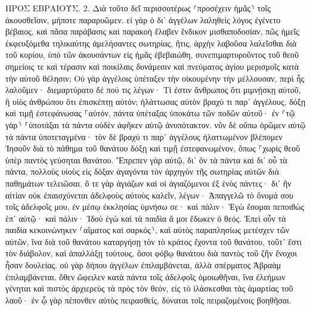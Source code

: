 \documentclass[twoside, 9pt]{extreport}
\begin{document}
ΠΡΟΣ ΕΒΡΑΙΟΥΣ.
2.
Διὰ τοῦτο δεῖ περισσοτέρως ⸂προσέχειν ἡμᾶς⸃ τοῖς ἀκουσθεῖσιν, μήποτε παραρυῶμεν. 
εἰ γὰρ ὁ δι᾽ ἀγγέλων λαληθεὶς λόγος ἐγένετο βέβαιος, καὶ πᾶσα παράβασις καὶ παρακοὴ ἔλαβεν ἔνδικον μισθαποδοσίαν, 
πῶς ἡμεῖς ἐκφευξόμεθα τηλικαύτης ἀμελήσαντες σωτηρίας, ἥτις, ἀρχὴν λαβοῦσα λαλεῖσθαι διὰ τοῦ κυρίου, ὑπὸ τῶν ἀκουσάντων εἰς ἡμᾶς ἐβεβαιώθη, 
συνεπιμαρτυροῦντος τοῦ θεοῦ σημείοις τε καὶ τέρασιν καὶ ποικίλαις δυνάμεσιν καὶ πνεύματος ἁγίου μερισμοῖς κατὰ τὴν αὐτοῦ θέλησιν; 
Οὐ γὰρ ἀγγέλοις ὑπέταξεν τὴν οἰκουμένην τὴν μέλλουσαν, περὶ ἧς λαλοῦμεν· 
διεμαρτύρατο δέ πού τις λέγων· Τί ἐστιν ἄνθρωπος ὅτι μιμνῄσκῃ αὐτοῦ, ἢ υἱὸς ἀνθρώπου ὅτι ἐπισκέπτῃ αὐτόν; 
ἠλάττωσας αὐτὸν βραχύ τι παρ᾽ ἀγγέλους, δόξῃ καὶ τιμῇ ἐστεφάνωσας ⸀αὐτόν, 
πάντα ὑπέταξας ὑποκάτω τῶν ποδῶν αὐτοῦ· ἐν ⸂τῷ γὰρ⸃ ⸀ὑποτάξαι τὰ πάντα οὐδὲν ἀφῆκεν αὐτῷ ἀνυπότακτον. νῦν δὲ οὔπω ὁρῶμεν αὐτῷ τὰ πάντα ὑποτεταγμένα· 
τὸν δὲ βραχύ τι παρ᾽ ἀγγέλους ἠλαττωμένον βλέπομεν Ἰησοῦν διὰ τὸ πάθημα τοῦ θανάτου δόξῃ καὶ τιμῇ ἐστεφανωμένον, ὅπως ⸀χωρὶς θεοῦ ὑπὲρ παντὸς γεύσηται θανάτου. 
Ἔπρεπεν γὰρ αὐτῷ, δι᾽ ὃν τὰ πάντα καὶ δι᾽ οὗ τὰ πάντα, πολλοὺς υἱοὺς εἰς δόξαν ἀγαγόντα τὸν ἀρχηγὸν τῆς σωτηρίας αὐτῶν διὰ παθημάτων τελειῶσαι. 
ὅ τε γὰρ ἁγιάζων καὶ οἱ ἁγιαζόμενοι ἐξ ἑνὸς πάντες· δι᾽ ἣν αἰτίαν οὐκ ἐπαισχύνεται ἀδελφοὺς αὐτοὺς καλεῖν, 
λέγων· Ἀπαγγελῶ τὸ ὄνομά σου τοῖς ἀδελφοῖς μου, ἐν μέσῳ ἐκκλησίας ὑμνήσω σε· 
καὶ πάλιν· Ἐγὼ ἔσομαι πεποιθὼς ἐπ᾽ αὐτῷ· καὶ πάλιν· Ἰδοὺ ἐγὼ καὶ τὰ παιδία ἅ μοι ἔδωκεν ὁ θεός. 
Ἐπεὶ οὖν τὰ παιδία κεκοινώνηκεν ⸂αἵματος καὶ σαρκός⸃, καὶ αὐτὸς παραπλησίως μετέσχεν τῶν αὐτῶν, ἵνα διὰ τοῦ θανάτου καταργήσῃ τὸν τὸ κράτος ἔχοντα τοῦ θανάτου, τοῦτ᾽ ἔστι τὸν διάβολον, 
καὶ ἀπαλλάξῃ τούτους, ὅσοι φόβῳ θανάτου διὰ παντὸς τοῦ ζῆν ἔνοχοι ἦσαν δουλείας. 
οὐ γὰρ δήπου ἀγγέλων ἐπιλαμβάνεται, ἀλλὰ σπέρματος Ἀβραὰμ ἐπιλαμβάνεται. 
ὅθεν ὤφειλεν κατὰ πάντα τοῖς ἀδελφοῖς ὁμοιωθῆναι, ἵνα ἐλεήμων γένηται καὶ πιστὸς ἀρχιερεὺς τὰ πρὸς τὸν θεόν, εἰς τὸ ἱλάσκεσθαι τὰς ἁμαρτίας τοῦ λαοῦ· 
ἐν ᾧ γὰρ πέπονθεν αὐτὸς πειρασθείς, δύναται τοῖς πειραζομένοις βοηθῆσαι. 
\end{document}
